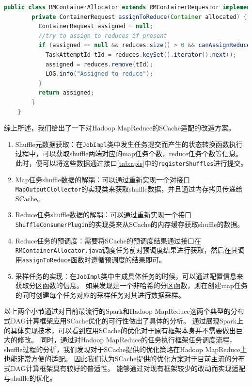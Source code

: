 \begin{lstlisting}[language={Java}, caption={Hadoop MapReduce中reduce任务调度代码片段}, label={code:hadoopschedule}]
    public class RMContainerAllocator extends RMContainerRequestor implements ContainerAllocator {
        private ContainerRequest assignToReduce(Container allocated) {
          ContainerRequest assigned = null;
          //try to assign to reduces if present
          if (assigned == null && reduces.size() > 0 && canAssignReduces()) {
            TaskAttemptId tId = reduces.keySet().iterator().next();
            assigned = reduces.remove(tId);
            LOG.info("Assigned to reduce");
          }
          return assigned;
        }
    }
\end{lstlisting}

综上所述，我们给出了一下对Hadoop MapReduce的SCache适配的改造方案。
\begin{enumerate}
    \item Shuffle元数据获取：在\verb|JobImpl|类中发生任务提交而产生的状态转换函数执行过程中，可以获取shuffle两端对应的map任务个数，reduce任务个数等信息。
    此时，便可以将这些数据通过接口\ref{tab:apis}中的\verb|registerShuffles|进行提交。
    \item Map任务shuffle数据的解耦：可以通过重新实现一个对接口\verb|MapOutputClollector|的实现类来获取shuffle数据，并且通过内存拷贝传递给SCache。
    \item Reduce任务shuffle数据的解耦：可以通过重新实现一个接口\verb|ShuffleConsumerPlugin|的实现类来从SCache的内存缓存获取shuffle的数据。
    \item Reduce任务的预调度：需要将SCache的预调度结果通过接口在\verb|RMContainerAllocator.java|调度任务前对预调度结果进行获取，然后在其调用\verb|assignToReduce|函数时遵循预调度的结果即可。
    \item 采样任务的实现：在\verb|JobImpl|类中生成具体任务的时候，可以通过配置信息来获取分区函数的信息。
    如果发现是一个非哈希的分区函数，则在创建map任务的同时创建每个任务对应的采样任务对其进行数据采样。
\end{enumerate}

以上两个小节通过对目前最流行的Spark和Hadoop MapReduce这两个典型的分布式DAG计算框架应用SCache优化的可行性做出了具体的分析。
通过展现Spark上的具体实现技术，可以看到应用SCache的优化对于原有框架本身并不需要做出巨大的修改。
同时，通过对Hadoop MapReduce的任务执行框架任务调度流程，shuffle过程的分析，我们发现对于SCache提供的优化策略在Hadoop MapReduce上也能非常方便的适配。
因此我们认为SCache提供的优化方案对于目前主流的分布式DAG计算框架具有较好的普适性。
能够通过对现有框架较少的改动而实现适配与shuffle的优化。
